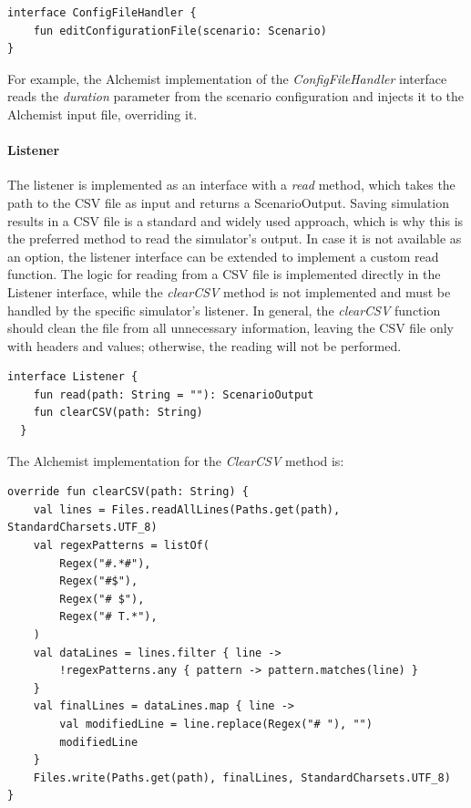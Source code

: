 \documentclass[12pt,a4paper,openright,twoside]{book}
\begin{document}
\begin{lstlisting}[language=my-kotlin, caption={ConfigFileHandler interface}]
  interface ConfigFileHandler {
    fun editConfigurationFile(scenario: Scenario)
}
\end{lstlisting}

For example, the Alchemist implementation of the \emph{ConfigFileHandler} interface reads the \emph{duration} parameter from the scenario configuration and injects it to the Alchemist input file, overriding it.

\paragraph*{Listener}
The listener is implemented as an interface with a \emph{read} method, which takes the path to the CSV file as input and returns a ScenarioOutput. 
Saving simulation results in a CSV file is a standard and widely used approach, which is why this is the preferred method to read the simulator's output. 
In case it is not available as an option, the listener interface can be extended to implement a custom read function. 
The logic for reading from a CSV file is implemented directly in the Listener interface, while the \emph{clearCSV} method is not implemented and must be handled by the specific simulator's listener. 
In general, the \emph{clearCSV} function should clean the file from all unnecessary information, leaving the CSV file only with headers and values; otherwise, the reading will not be performed.

\begin{lstlisting}[language=my-kotlin, caption={Listener interface.}]
  interface Listener {
    fun read(path: String = ""): ScenarioOutput
    fun clearCSV(path: String)
  }
\end{lstlisting}

The Alchemist implementation for the \emph{ClearCSV} method is:

\begin{lstlisting}[language=my-kotlin, caption={CSV file cleaning in Alchemist}]
override fun clearCSV(path: String) {
    val lines = Files.readAllLines(Paths.get(path), StandardCharsets.UTF_8)
    val regexPatterns = listOf(
        Regex("#.*#"),
        Regex("#$"),
        Regex("# $"),
        Regex("# T.*"),
    )
    val dataLines = lines.filter { line ->
        !regexPatterns.any { pattern -> pattern.matches(line) }
    }
    val finalLines = dataLines.map { line ->
        val modifiedLine = line.replace(Regex("# "), "")
        modifiedLine
    }
    Files.write(Paths.get(path), finalLines, StandardCharsets.UTF_8)
}
\end{lstlisting}
\end{document}
